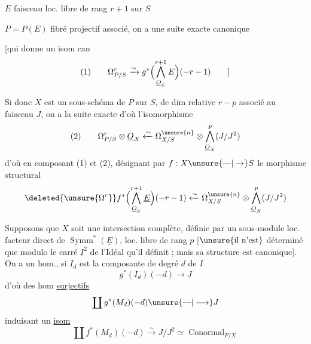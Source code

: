 
$E$ faisceau loc. libre de rang $r+1$ sur $S$

$P=P(E)$ fibré projectif associé, on a une suite exacte canonique

[qui donne un isom can
\[
(1)\qquad\Omega^r_{P/S}\xrightarrow{\sim}g^*\Bigl(\bigwedge_{\underline O_S}^{r+1}E\Bigr)(-r-1)
\qquad]
\]

Si donc $X$ est un sous-schéma de $P$  sur $S$, de dim relative $r-p$
associé au faisceau   $J$, on a la suite exacte
d'où l'isomorphisme
\[
(2)\qquad\Omega^r_{P/S}\otimes\underline O_X
\xleftarrow{\sim}\Omega^{\unsure{n}}_{X/S}\otimes\bigwedge_{\underline O_X}^p(J/J^2)
\]
d'où en composant (1) et (2), désignant par $f:X\unsure{\text{---}|\to}S$
le morphisme structural
\[
\deleted{\unsure{\Omega^r}}
f^*\Bigl(\bigwedge_{\underline O_S}^{r+1}\underline E\Bigr)(-r-1)
\xleftarrow{\sim}\Omega^{\unsure{n}}_{X/S}\otimes\bigwedge_{\underline O_X}^p(J/J^2)
\]

Supposons que $X$ soit une intersection complète, définie
par un sous-module  loc. facteur direct de
$\operatorname{Symm}^*(\underline E)$,
\deleted{[qui est \unsure{un}} loc. libre de rang $p$
[$\unsure{\text{il n'est}}$ 
déterminé que modulo le carré $\underline I^2$ de l'Idéal qu'il
définit ; mais sa structure est canonique]. On a
un hom., si $I_d$ est la composante de degré $d$ de $I$
\[
g^*(I_d)(-d)\longrightarrow J
\]
d'où des hom \uline{surjectifs}
\[
\coprod g^*(M_d)(-d)\unsure{\text{---}|\longrightarrow}J
\]
induisant un \uline{isom}
\[
\coprod f^*(M_d)(-d)\xrightarrow{\sim}J/J^2\simeq\operatorname{Conormal}_{P/X}
\]

